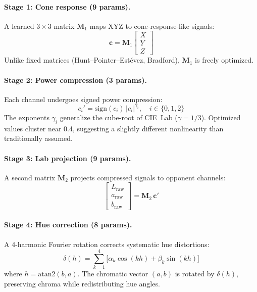 \documentclass[11pt, twocolumn]{article}
\begin{document}
\paragraph{Stage 1: Cone response (9 params).}
A learned $3\!\times\!3$ matrix $\mathbf{M}_1$ maps XYZ to
cone-response-like signals:
\begin{equation}
  \mathbf{c} = \mathbf{M}_1 \begin{bmatrix} X \\ Y \\ Z \end{bmatrix}
\end{equation}
Unlike fixed matrices (Hunt--Pointer--Est\'evez, Bradford),
$\mathbf{M}_1$ is freely optimized.

\paragraph{Stage 2: Power compression (3 params).}
Each channel undergoes signed power compression:
\begin{equation}
  c_i' = \mathrm{sign}(c_i)\,|c_i|^{\gamma_i}, \quad i \in \{0,1,2\}
\end{equation}
The exponents $\gamma_i$ generalize the cube-root of CIE~Lab
($\gamma = 1/3$). Optimized values cluster near 0.4, suggesting a
slightly different nonlinearity than traditionally assumed.

\paragraph{Stage 3: Lab projection (9 params).}
A second matrix $\mathbf{M}_2$ projects compressed signals to
opponent channels:
\begin{equation}
  \begin{bmatrix} L_\mathrm{raw} \\ a_\mathrm{raw} \\ b_\mathrm{raw} \end{bmatrix} = \mathbf{M}_2 \, \mathbf{c}'
\end{equation}

\paragraph{Stage 4: Hue correction (8 params).}
A 4-harmonic Fourier rotation corrects systematic hue distortions:
\begin{equation}
  \delta(h) = \sum_{k=1}^{4}\!\bigl[\alpha_k\cos(kh) + \beta_k\sin(kh)\bigr]
\end{equation}
where $h = \mathrm{atan2}(b, a)$. The chromatic vector $(a,b)$ is
rotated by $\delta(h)$, preserving chroma while redistributing
hue angles.
\end{document}
